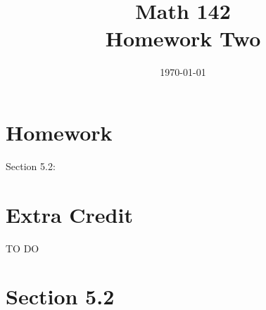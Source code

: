 \documentclass{exam}
\author{}
\date{\today}
\title{Math 142 \\ Homework Two}
\begin{document}
  \maketitle

  \section{Homework}
  Section 5.2: 

  \section{Extra Credit}
  TO DO

  \ifprintanswers
    \section{Section 5.2}
\end{document}
